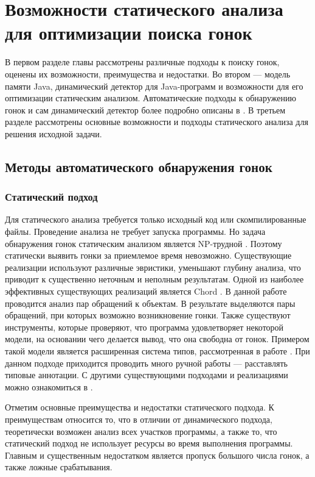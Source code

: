 \chapter{Возможности статического анализа для оптимизации поиска гонок}
\label{chapSVD}

В первом разделе главы рассмотрены различные подходы к поиску гонок, оценены их возможности, преимущества и недостатки. 
Во втором --- модель памяти Java, динамический детектор для Java-программ и возможности для его оптимизации статическим анализом.
Автоматические подходы к обнаружению гонок и сам динамический детектор более подробно описаны в \cite{DRD}.
В третьем разделе рассмотрены основные возможности и подходы статического анализа для решения исходной задачи.


\FloatBarrier
\section{Методы автоматического обнаружения гонок}
\subsection{Статический подход}
\label{StaticRaceDetection}
Для статического анализа требуется только исходный код или скомпилированные файлы. Проведение анализа не требует запуска программы. Но задача обнаружения гонок статическим анализом является NP-трудной \cite{RaceDetectionReview, RaceDetection}. Поэтому статически выявить гонки за приемлемое время невозможно. Существующие реализации используют различные эвристики, уменьшают глубину анализа, что приводит к существенно неточным и неполным результатам. 
Одной из наиболее эффективных существующих реализаций является Chord \cite{Chord, JChord}. В данной работе проводится анализ пар обращений к объектам. В результате выделяются пары обращений, при которых возможно возникновение гонки. Также существуют инструменты, которые проверяют, что программа удовлетворяет некоторой модели, на основании чего делается вывод, что она свободна от гонок. Примером такой модели является расширенная система типов, рассмотренная в работе \cite{Race-Free}. При данном подходе приходится проводить много ручной работы --- расставлять типовые аннотации. С другими существующими подходами и реализациями можно ознакомиться в \cite{RacerX, StaticDetection}.

Отметим основные преимущества и недостатки статического подхода. К преимуществам относится то, что в отличии от динамического подхода, теоретически возможен анализ всех участков программы, а также то, что статический подход  не использует ресурсы во время выполнения программы. Главным и существенным недостатком является
пропуск большого числа гонок, а также ложные срабатывания. 


